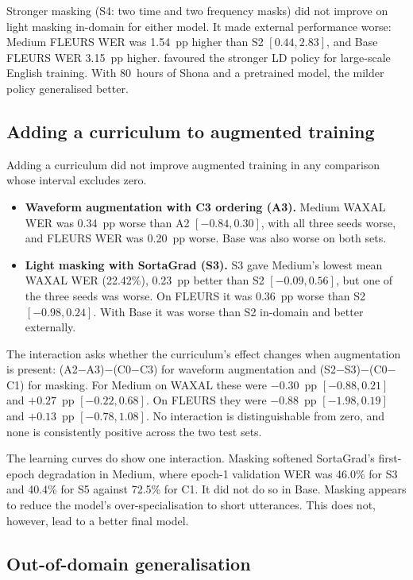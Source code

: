 \documentclass[12pt,a4paper]{report}
\begin{document}
Stronger masking (S4: two time and two frequency masks) did not improve on light
masking in-domain for either model. It made external performance worse:
Medium FLEURS WER was 1.54~pp higher than S2 $[0.44, 2.83]$, and Base FLEURS WER
3.15~pp higher. \citet{Park2019} favoured the stronger LD policy for
large-scale English training. With 80~hours of Shona and a pretrained model,
the milder policy generalised better.

\subsection{Adding a curriculum to augmented training}

Adding a curriculum did not improve augmented training in any comparison whose
interval excludes zero.
\begin{itemize}
\item \textbf{Waveform augmentation with C3 ordering (A3).} Medium WAXAL WER was
0.34~pp worse than A2 $[-0.84, 0.30]$, with all three seeds worse, and FLEURS
WER was 0.20~pp worse. Base was also worse on both sets.
\item \textbf{Light masking with SortaGrad (S3).} S3 gave Medium's lowest mean
WAXAL WER (22.42\%), 0.23~pp better than S2 $[-0.09, 0.56]$, but one of the three
seeds was worse. On FLEURS it was 0.36~pp worse than S2 $[-0.98, 0.24]$. With
Base it was worse than S2 in-domain and better externally.
\end{itemize}

The interaction asks whether the curriculum's effect changes when augmentation
is present: (A2$-$A3)$-$(C0$-$C3) for waveform augmentation and
(S2$-$S3)$-$(C0$-$C1) for masking. For Medium on WAXAL these were $-0.30$~pp
$[-0.88, 0.21]$ and $+0.27$~pp $[-0.22, 0.68]$. On FLEURS they were $-0.88$~pp
$[-1.98, 0.19]$ and $+0.13$~pp $[-0.78, 1.08]$. No interaction is
distinguishable from zero, and none is consistently positive across the two
test sets.

The learning curves do show one interaction. Masking softened SortaGrad's
first-epoch degradation in Medium, where epoch-1 validation WER was 46.0\% for
S3 and 40.4\% for S5 against 72.5\% for C1. It did not do so in Base. Masking
appears to reduce the model's over-specialisation to short utterances. This
does not, however, lead to a better final model.

\subsection{Out-of-domain generalisation}
\end{document}
